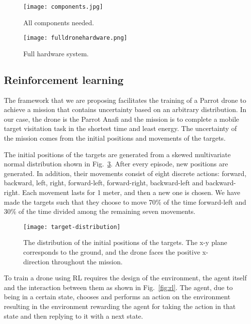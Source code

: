 \documentclass[../main.tex]{subfiles}
\begin{document}
\begin{figure}[p]
	\centering
	\texttt{[image: components.jpg]}
	\caption{All components needed.}
	\label{fig:components}
\end{figure}

\begin{figure}[h]
	\centering
	\texttt{[image: fulldronehardware.png]}
	\caption{Full hardware system.}
	\label{fig:full-hardware}
\end{figure}  



\subsection{Reinforcement learning}

The framework that we are proposing facilitates the training of
a Parrot drone to achieve a mission that contains uncertainty
based on an arbitrary distribution. 
In our case, the drone is the Parrot Anafi and 
the mission is to complete a 
mobile target visitation task 
in the shortest time and least energy.
The uncertainty of the mission comes from the initial positions and 
movements of the targets.

The initial positions of the targets are generated from 
a skewed
multivariate normal distribution shown in Fig.~\ref{fig:position-distribution}.
After every episode, new positions are generated.
In addition, their movements consist of eight discrete
actions: forward, backward, left, right,
forward-left, forward-right, backward-left and backward-right.
Each movement lasts for 1 meter, and then a new one is
chosen.
We have made the targets such that they choose to move 70\% 
of the time forward-left and 30\% of the time divided
among the remaining seven movements.

\begin{figure}[!t]
	\centering
	\texttt{[image: target-distribution]}
	\caption{The distribution of the initial positions of the
		targets. The x-y plane corresponds to the ground, and 
		the drone faces the positive x-direction throughout the mission.}
	\label{fig:position-distribution}
\end{figure}

To train a drone using RL requires the
design of the environment, the agent itself and
the interaction between them as shown in Fig.~\ref{fig:rl}. 
The agent, due to being in a certain state, chooses and 
performs an action on
the environment resulting in the environment 
rewarding the agent for taking the action in that state
and then replying to it with a next state.
\end{document}
